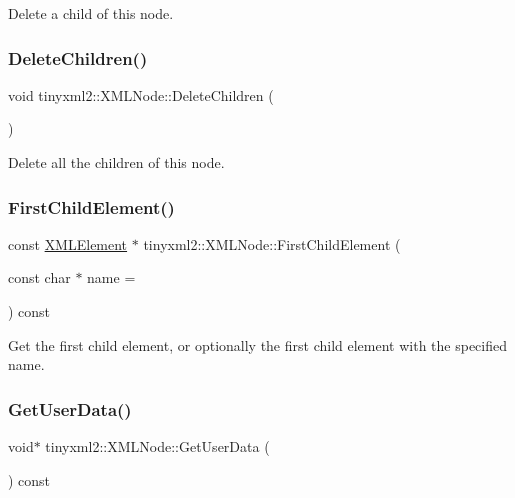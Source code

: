 Delete a child of this node. \mbox{\label{classtinyxml2_1_1_x_m_l_node_a0360085cc54df5bff85d5c5da13afdce}} 
\subsubsection{\texorpdfstring{Delete\+Children()}{DeleteChildren()}}
{\footnotesize\ttfamily void tinyxml2\+::\+X\+M\+L\+Node\+::\+Delete\+Children (\begin{DoxyParamCaption}{ }\end{DoxyParamCaption})}

Delete all the children of this node. \mbox{\label{classtinyxml2_1_1_x_m_l_node_a1bec132dcf085284e0a10755f2cf0d57}} 
\subsubsection{\texorpdfstring{First\+Child\+Element()}{FirstChildElement()}}
{\footnotesize\ttfamily const \mbox{\hyperlink{classtinyxml2_1_1_x_m_l_element}{X\+M\+L\+Element}} $\ast$ tinyxml2\+::\+X\+M\+L\+Node\+::\+First\+Child\+Element (\begin{DoxyParamCaption}\item[{const char $\ast$}]{name = {} }\end{DoxyParamCaption}) const}

Get the first child element, or optionally the first child element with the specified name. \mbox{\label{classtinyxml2_1_1_x_m_l_node_a7f0687574afa03bc479dc44f29db0afe}} 
\subsubsection{\texorpdfstring{Get\+User\+Data()}{GetUserData()}}
{\footnotesize\ttfamily void$\ast$ tinyxml2\+::\+X\+M\+L\+Node\+::\+Get\+User\+Data (\begin{DoxyParamCaption}{ }\end{DoxyParamCaption}) const\hspace{0.3cm}{\ttfamily [inline]}}

